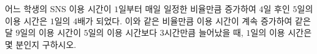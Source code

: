 어느 학생의 SNS 이용 시간이 $1$일부터 매일 일정한 비율만큼 증가하여 $4$일 후인 $5$일의 이용 시간은 $1$일의 $4$배가 되었다. 이와 같은 비율만큼 이용 시간이 계속 증가하여 같은 달 $9$일의 이용 시간이 $5$일의 이용 시간보다 $3$시간만큼 늘어났을 때, $1$일의 이용 시간은 몇 분인지 구하시오.
